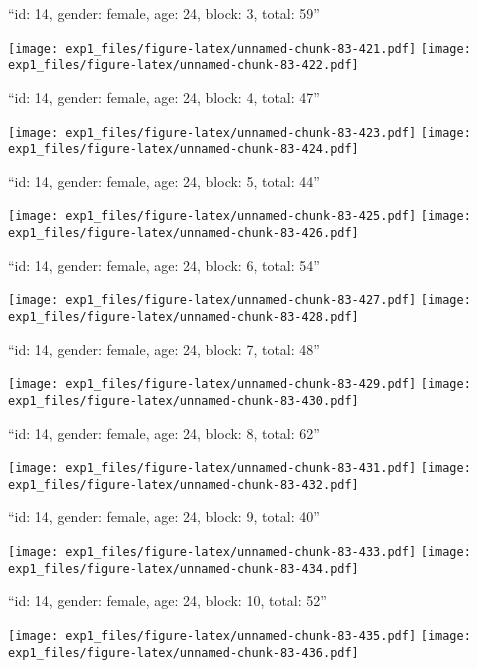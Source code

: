 \documentclass[11pt,,]{article}
\begin{document}
\newpage
[1] 

``id: 14, gender: female, age: 24, block: 3, total: 59''

\texttt{[image: exp1\_files/figure-latex/unnamed-chunk-83-421.pdf]}
\texttt{[image: exp1\_files/figure-latex/unnamed-chunk-83-422.pdf]}

\newpage
[1] 

``id: 14, gender: female, age: 24, block: 4, total: 47''

\texttt{[image: exp1\_files/figure-latex/unnamed-chunk-83-423.pdf]}
\texttt{[image: exp1\_files/figure-latex/unnamed-chunk-83-424.pdf]}

\newpage
[1] 

``id: 14, gender: female, age: 24, block: 5, total: 44''

\texttt{[image: exp1\_files/figure-latex/unnamed-chunk-83-425.pdf]}
\texttt{[image: exp1\_files/figure-latex/unnamed-chunk-83-426.pdf]}

\newpage
[1] 

``id: 14, gender: female, age: 24, block: 6, total: 54''

\texttt{[image: exp1\_files/figure-latex/unnamed-chunk-83-427.pdf]}
\texttt{[image: exp1\_files/figure-latex/unnamed-chunk-83-428.pdf]}

\newpage
[1] 

``id: 14, gender: female, age: 24, block: 7, total: 48''

\texttt{[image: exp1\_files/figure-latex/unnamed-chunk-83-429.pdf]}
\texttt{[image: exp1\_files/figure-latex/unnamed-chunk-83-430.pdf]}

\newpage
[1] 

``id: 14, gender: female, age: 24, block: 8, total: 62''

\texttt{[image: exp1\_files/figure-latex/unnamed-chunk-83-431.pdf]}
\texttt{[image: exp1\_files/figure-latex/unnamed-chunk-83-432.pdf]}

\newpage
[1] 

``id: 14, gender: female, age: 24, block: 9, total: 40''

\texttt{[image: exp1\_files/figure-latex/unnamed-chunk-83-433.pdf]}
\texttt{[image: exp1\_files/figure-latex/unnamed-chunk-83-434.pdf]}

\newpage
[1] 

``id: 14, gender: female, age: 24, block: 10, total: 52''

\texttt{[image: exp1\_files/figure-latex/unnamed-chunk-83-435.pdf]}
\texttt{[image: exp1\_files/figure-latex/unnamed-chunk-83-436.pdf]}
\end{document}
